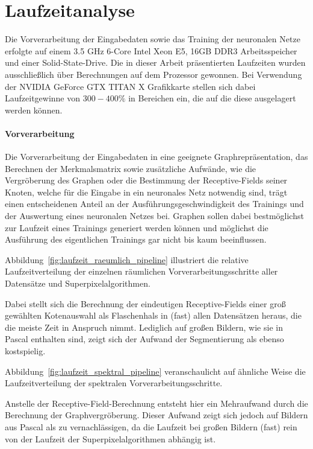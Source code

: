 \section{Laufzeitanalyse}
\label{laufzeitanalyse}

Die Vorverarbeitung der Eingabedaten sowie das Training der neuronalen Netze erfolgte auf einem 3.5 GHz 6-Core Intel Xeon E5, 16GB DDR3 Arbeitsspeicher und einer Solid-State-Drive.
Die in dieser Arbeit präsentierten Laufzeiten wurden ausschließlich über Berechnungen auf dem Prozessor gewonnen.
Bei Verwendung der NVIDIA GeForce GTX TITAN X Grafikkarte stellen sich dabei Laufzeitgewinne von $300 - 400 \%$ in Bereichen ein, die auf die diese ausgelagert werden können.

\paragraph{Vorverarbeitung}

Die Vorverarbeitung der Eingabedaten in eine geeignete Graph\-re\-prä\-sen\-ta\-tion, das Berechnen der Merkmalsmatrix sowie zusätzliche Aufwände, wie die Vergröberung des Graphen oder die Bestimmung der Receptive-Fields seiner Knoten, welche für die Eingabe in ein neuronales Netz notwendig sind, trägt einen entscheidenen Anteil an der Ausführungsgeschwindigkeit des Trainings und der Auswertung eines neuronalen Netzes bei.
Graphen sollen dabei bestmöglichst zur Laufzeit eines Trainings generiert werden können und möglichst die Ausführung des eigentlichen Trainings gar nicht bis kaum beeinflussen.

Abbildung~\ref{fig:laufzeit_raeumlich_pipeline} illustriert die relative Laufzeitverteilung der einzelnen räumlichen Vorverarbeitungsschritte \bzgl{} aller Datensätze und Superpixelalgorithmen.

Dabei stellt sich die Berechnung der eindeutigen Receptive-Fields einer groß gewählten Kotenauswahl als Flaschenhals in (fast) allen Datensätzen heraus, die die meiste Zeit in Anspruch nimmt.
Lediglich auf großen Bildern, wie sie in \gls{Pascal} enthalten sind, zeigt sich der Aufwand der Segmentierung als ebenso kostspielig.

Abbildung~\ref{fig:laufzeit_spektral_pipeline} veranschaulicht auf ähnliche Weise die Laufzeitverteilung der spektralen Vorverarbeitungsschritte.

Anstelle der Receptive-Field-Berechnung entsteht hier ein Mehraufwand durch die Berechnung der Graphvergröberung.
Dieser Aufwand zeigt sich jedoch auf Bildern aus \gls{Pascal} als zu vernachlässigen, da die Laufzeit bei großen Bildern (fast) rein von der Laufzeit der Superpixelalgorithmen abhängig ist.

